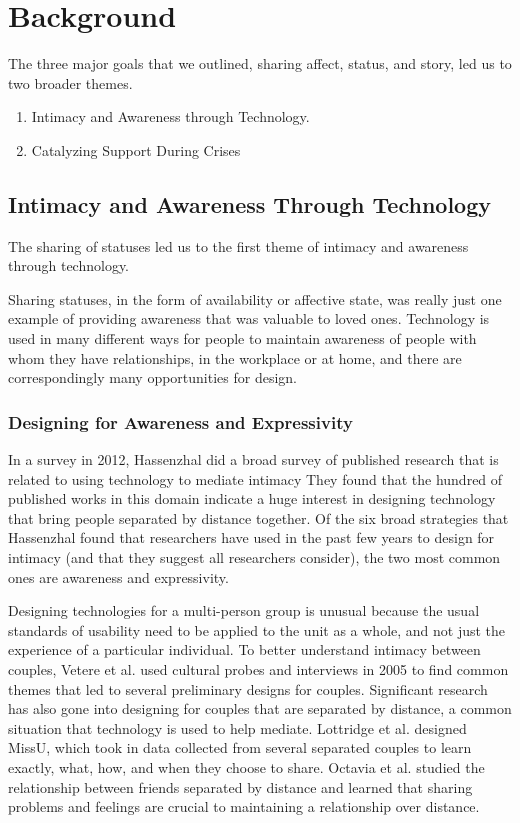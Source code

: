 \chapter{Background}
  The three major goals that we outlined,
  sharing affect, status, and story, led us to two broader themes.
  \begin{enumerate}
  \item Intimacy and Awareness through Technology.
  \item Catalyzing Support During Crises
  \end{enumerate}

\section{Intimacy and Awareness Through Technology}
  The sharing of statuses led us to the first theme of
  intimacy and awareness through technology.

  Sharing statuses,
  in the form of availability or affective state,
  was really just one example of providing awareness that was valuable to loved ones.
  Technology is used in many different ways for people to maintain
  awareness of people with whom they have relationships,
  in the workplace or at home,
  and there are correspondingly many opportunities for design.

  \subsection{Designing for Awareness and Expressivity}
    In a survey in 2012, Hassenzhal did a broad survey of published research
    that is related to using technology to mediate intimacy
    \cite{hassenzhal12}
    They found that the hundred of published works in this domain indicate a
    huge interest in designing technology that bring people separated by distance together.
    Of the six broad strategies that Hassenzhal found
    that researchers have used in the past few years to design for intimacy
    (and that they suggest all researchers consider),
    the two most common ones are awareness and expressivity.

    Designing technologies for a multi-person group is unusual because the usual
    standards of usability need to be applied to the unit as a whole, and not just
    the experience of a particular individual. \cite{neustaedter12}
    To better understand intimacy between couples,
    Vetere et al. used cultural probes and interviews in 2005 to find
    common themes that led to several preliminary designs for couples.
    Significant research has also gone into designing for couples that are
    separated by distance,
    a common situation that technology is used to help mediate.
    \cite{vetere05}
    Lottridge et al. designed MissU, which took in data collected from several separated couples
    to learn exactly, what, how, and when they choose to share.
    \cite{lottridge09}
    Octavia et al. studied the relationship between friends separated by distance
    and learned that sharing problems and feelings are crucial to
    maintaining a relationship over distance.
    \cite{octavia07}

